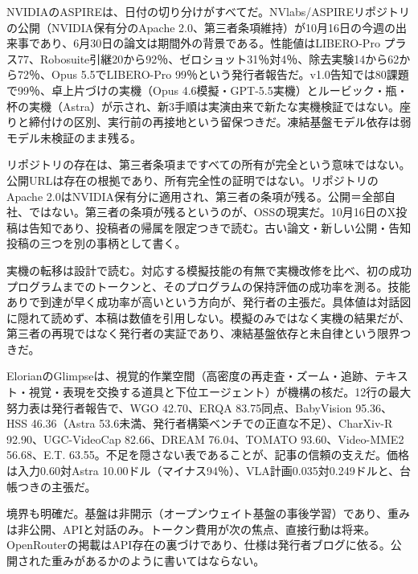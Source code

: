 \documentclass[lualatex,a4paper,10pt]{jlreq}
\begin{document}

NVIDIAのASPIREは、日付の切り分けがすべてだ。NVlabs/ASPIREリポジトリの公開（NVIDIA保有分のApache 2.0、第三者条項維持）が10月16日の今週の出来事であり、6月30日の論文は期間外の背景である。性能値はLIBERO-Pro プラス77、Robosuite引継20から92％、ゼロショット31％対4％、除去実験14から62から72％、Opus 5.5でLIBERO-Pro 99％という発行者報告だ。v1.0告知では80課題で99％、卓上片づけの実機（Opus 4.6模擬・GPT-5.5実機）とルービック・瓶・杯の実機（Astra）が示され、新3手順は実演由来で新たな実機検証ではない。座りと締付けの区別、実行前の再接地という留保つきだ。凍結基盤モデル依存は弱モデル未検証のまま残る。
\cite{B57,B56,B89}


リポジトリの存在は、第三者条項まですべての所有が完全という意味ではない。公開URLは存在の根拠であり、所有完全性の証明ではない。リポジトリのApache 2.0はNVIDIA保有分に適用され、第三者の条項が残る。公開＝全部自社、ではない。第三者の条項が残るというのが、OSSの現実だ。10月16日のX投稿は告知であり、投稿者の帰属を限定つきで読む。古い論文・新しい公開・告知投稿の三つを別の事柄として書く。
\cite{B57,B56}


実機の転移は設計で読む。対応する模擬技能の有無で実機改修を比べ、初の成功プログラムまでのトークンと、そのプログラムの保持評価の成功率を測る。技能ありで到達が早く成功率が高いという方向が、発行者の主張だ。具体値は対話図に隠れて読めず、本稿は数値を引用しない。模擬のみではなく実機の結果だが、第三者の再現ではなく発行者の実証であり、凍結基盤依存と未自律という限界つきだ。
\cite{B57,B56,B89}


ElorianのGlimpseは、視覚的作業空間（高密度の再走査・ズーム・追跡、テキスト・視覚・表現を交換する道具と下位エージェント）が機構の核だ。12行の最大努力表は発行者報告で、WGO 42.70、ERQA 83.75同点、BabyVision 95.36、HSS 46.36（Astra 53.6未満、発行者構築ベンチでの正直な不足）、CharXiv-R 92.90、UGC-VideoCap 82.66、DREAM 76.04、TOMATO 93.60、Video-MME2 56.68、E.T. 63.55。不足を隠さない表であることが、記事の信頼の支えだ。価格は入力0.60対Astra 10.00ドル（マイナス94％）、VLA計画0.035対0.249ドルと、台帳つきの主張だ。
\cite{B58,B59,B88}


境界も明確だ。基盤は非開示（オープンウェイト基盤の事後学習）であり、重みは非公開、APIと対話のみ。トークン費用が次の焦点、直接行動は将来。OpenRouterの掲載はAPI存在の裏づけであり、仕様は発行者ブログに依る。公開された重みがあるかのように書いてはならない。
\cite{B58,B59,B88}
\end{document}

